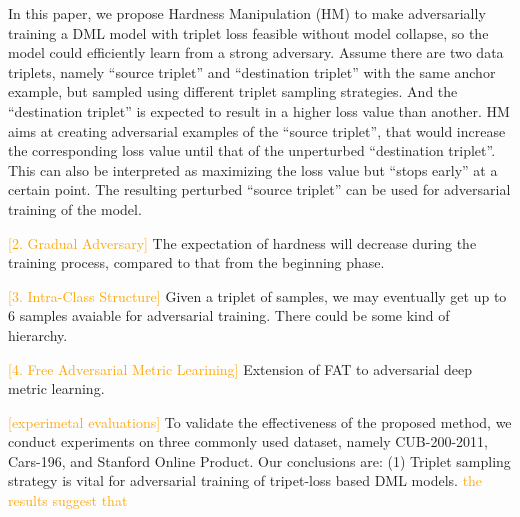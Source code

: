 \documentclass[10pt,twocolumn,letterpaper]{article}
\newcommand{\oo}[1]{\textcolor{orange}{#1}}
\begin{document}
In this paper, we propose Hardness Manipulation (HM) to make adversarially
training a DML model with triplet loss feasible without model collapse, so the
model could efficiently learn from a strong adversary.
%
Assume there are two data triplets, namely ``source triplet'' and ``destination
triplet'' with the same anchor example, but sampled using different triplet
sampling strategies.
%
And the ``destination triplet'' is expected to result in a higher loss value
than another.
%
HM aims at creating adversarial examples of the ``source triplet'', that would
increase the corresponding loss value until that of the unperturbed
``destination triplet''.
%
This can also be interpreted as maximizing the loss value but ``stops early''
at a certain point.
%
The resulting perturbed ``source triplet'' can be used for adversarial
training of the model.

\oo{[2. Gradual Adversary]}
The expectation of hardness will decrease during the training process,
compared to that from the beginning phase.

\oo{[3. Intra-Class Structure]}
Given a triplet of samples, we may eventually get up to 6 samples avaiable
for adversarial training. There could be some kind of hierarchy.

\oo{[4. Free Adversarial Metric Learining]}
Extension of FAT to adversarial deep metric learning.

\oo{[experimetal evaluations]}
To validate the effectiveness of the proposed method, we conduct experiments
on three commonly used dataset, namely CUB-200-2011, Cars-196, and Stanford
Online Product. Our conclusions are:
%
(1) Triplet sampling strategy is vital for adversarial training of tripet-loss
based DML models.
%
\oo{the results suggest that}
\end{document}
